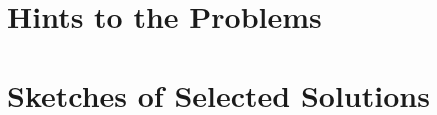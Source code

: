 \chapter{Hints to the Problems}
\begin{enumerate}
	
\end{enumerate}

\chapter{Sketches of Selected Solutions}
\begin{enumerate}
	
\end{enumerate}
